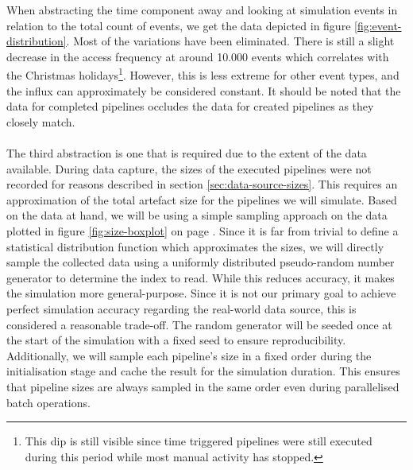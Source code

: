     When abstracting the time component away and looking at simulation events in relation to the total count of events, we get the data depicted in figure \ref{fig:event-distribution}. Most of the variations have been eliminated. There is still a slight decrease in the access frequency at around 10.000 events which correlates with the Christmas holidays\footnote{This dip is still visible since time triggered pipelines were still executed during this period while most manual activity has stopped.}. However, this is less extreme for other event types, and the influx can approximately be considered constant. It should be noted that the data for completed pipelines occludes the data for created pipelines as they closely match.\\ %
    \\
    The third abstraction is one that is required due to the extent of the data available. During data capture, the sizes of the executed pipelines were not recorded for reasons described in section \ref{sec:data-source-sizes}. This requires an approximation of the total artefact size for the pipelines we will simulate. Based on the data at hand, we will be using a simple sampling approach on the data plotted in figure \ref{fig:size-boxplot} on page \pageref{fig:size-boxplot}. Since it is far from trivial to define a statistical distribution function which approximates the sizes, we will directly sample the collected data using a uniformly distributed pseudo-random number generator to determine the index to read. While this reduces accuracy, it makes the simulation more general-purpose. Since it is not our primary goal to achieve perfect simulation accuracy regarding the real-world data source, this is considered a reasonable trade-off. The random generator will be seeded once at the start of the simulation with a fixed seed to ensure reproducibility. Additionally, we will sample each pipeline's size in a fixed order during the initialisation stage and cache the result for the simulation duration. This ensures that pipeline sizes are always sampled in the same order even during parallelised batch operations.
    
